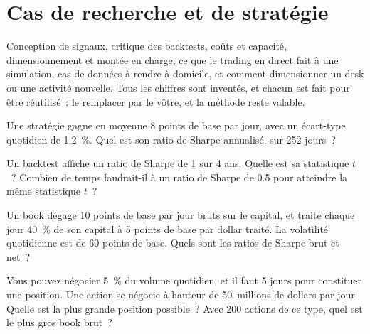 \chapter{Cas de recherche et de stratégie}\label{ch:iv2:research-and-strategy-cases}

\begin{ivtrains}
Conception de signaux, critique des backtests, coûts et capacité, dimensionnement et montée en charge, ce que le trading en direct fait à une simulation, cas de données à rendre à domicile, et comment dimensionner un desk ou une activité nouvelle. Tous les chiffres sont inventés, et chacun est fait pour être réutilisé~: le remplacer par le vôtre, et la méthode reste valable.
\end{ivtrains}

\begin{question}\label{iq:iv2:research-and-strategy-cases:1}
Une stratégie gagne en moyenne 8 points de base par jour, avec un écart-type quotidien de 1.2~\%. Quel est son ratio de Sharpe annualisé, sur 252 jours~?
\end{question}

\begin{question}\label{iq:iv2:research-and-strategy-cases:2}
Un backtest affiche un ratio de Sharpe de 1 sur 4 ans. Quelle est sa statistique $t$~? Combien de temps faudrait-il à un ratio de Sharpe de 0.5 pour atteindre la même statistique $t$~?
\end{question}

\begin{question}\label{iq:iv2:research-and-strategy-cases:3}
Un book dégage 10 points de base par jour bruts sur le capital, et traite chaque jour 40~\% de son capital à 5 points de base par dollar traité. La volatilité quotidienne est de 60 points de base. Quels sont les ratios de Sharpe brut et net~?
\end{question}

\begin{question}\label{iq:iv2:research-and-strategy-cases:4}
Vous pouvez négocier 5~\% du volume quotidien, et il faut 5 jours pour constituer une position. Une action se négocie à hauteur de 50~millions de dollars par jour. Quelle est la plus grande position possible~? Avec 200 actions de ce type, quel est le plus gros book brut~?
\end{question}

